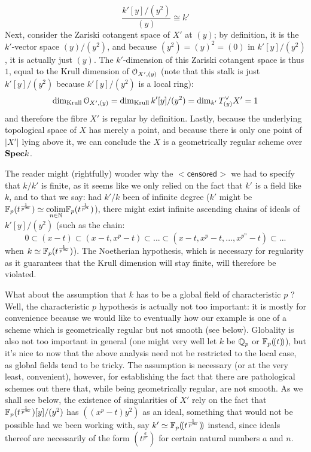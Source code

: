 \begin{example}
\begin{enumerate}
                            $$\frac{k'[y]/(y^2)}{(y)} \cong k'$$
                        Next, consider the Zariski cotangent space of $X'$ at $(y)$; by definition, it is the $k'$-vector space $(y)/(y^2)$, and because $(y^2) = (y)^2 = (0)$ in $k'[y]/(y^2)$, it is actually just $(y)$. The $k'$-dimension of this Zariski cotangent space is thus $1$, equal to the Krull dimension of $\mathcal{O}_{X', (y)}$ (note that this stalk is just $k'[y]/(y^2)$ because $k'[y]/(y^2)$ is a local ring):
                            $$\dim_{\mathrm{Krull}} \mathcal{O}_{X', (y)} = \dim_{\mathrm{Krull}} k'[y]/(y^2) = \dim_{k'} T^{\vee}_{(y)} X' = 1$$
                        and therefore the fibre $X'$ is regular by definition. Lastly, because the underlying topological space of $X$ has merely a point, and because there is only one point of $|X'|$ lying above it, we can conclude the $X$ is a geometrically regular scheme over $\mathbf{Spec} k$. 
                        
                        The reader might (rightfully) wonder why the $\mathsf{<censored>}$ we had to specify that $k/k'$ is finite, as it seems like we only relied on the fact that $k'$ is a field like $k$, and to that we say: had $k'/k$ been of infinite degree ($k'$ might be $\mathbb{F}_p(t^{\frac{1}{p^{\infty}}}) \simeq \underset{n \in \mathbb{N}}{\operatorname{colim}} \mathbb{F}_p(t^{\frac{1}{p^n}})$), there might exist infinite ascending chains of ideals of $k'[y]/(y^2)$ (such as the chain:
                            $$0 \subset (x - t) \subset (x - t, x^p - t) \subset ... \subset (x - t, x^p - t, ..., x^{p^n} - t) \subset ...$$
                        when $k \simeq \mathbb{F}_p(t^{\frac{1}{p^{\infty}}})$). The Noetherian hypothesis, which is necessary for regularity as it guarantees that the Krull dimension will stay finite, will therefore be violated. 
                        
                        What about the assumption that $k$ has to be a global field of characteristic $p$ ? Well, the characteristic $p$ hypothesis is actually not too important: it is mostly for convenience because we would like to eventually how our example is one of a scheme which is geometrically regular but not smooth (see below). Globality is also not too important in general (one might very well let $k$ be $\mathbb{Q}_p$ or $\mathbb{F}_p(\!(t)\!)$), but it's nice to now that the above analysis need not be restricted to the local case, as global fields tend to be tricky. The assumption is necessary (or at the very least, convenient), however, for establishing the fact that there are pathological schemes out there that, while being geometrically regular, are not smooth. As we shall see below, the existence of singularities of $X'$ rely on the fact that $\mathbb{F}_p(t^{\frac{1}{p^{\infty}}})[y]/(y^2)$ has $\left((x^p - t)y^2\right)$ as an ideal, something that would not be possible had we been working with, say $k' \simeq \mathbb{F}_p(\!(t^{\frac{1}{p^{\infty}}})\!)$ instead, since ideals thereof are necessarily of the form $(t^{\frac{a}{p^n}})$ for certain natural numbers $a$ and $n$. 
                        

\end{enumerate}
\end{example}
